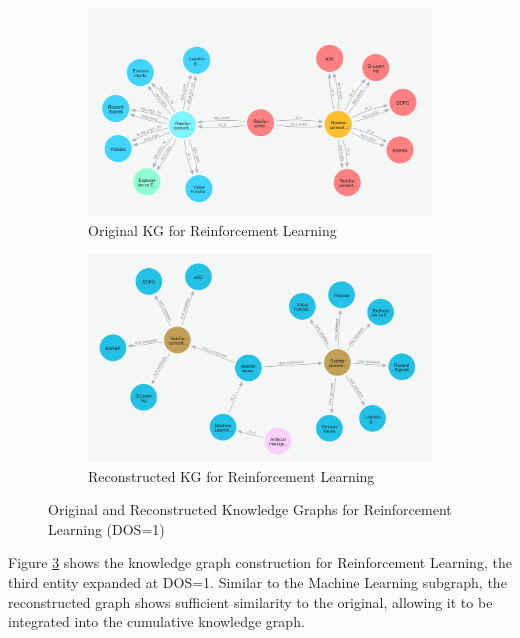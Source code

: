 \documentclass[11pt]{article}
\begin{document}
\begin{figure}[H]
    \centering
    \begin{subfigure}[b]{0.48\columnwidth}
        \centering
        \includegraphics[width=\textwidth]{img/original_dos1_Reinforcement_Learning.png}
        \caption{Original KG for Reinforcement Learning}
        \label{fig:dos1_rl_original}
    \end{subfigure}
    \hfill
    \begin{subfigure}[b]{0.48\columnwidth}
        \centering
        \includegraphics[width=\textwidth]{img/reconstructed_dos1_Reinforcement_Learning.png}
        \caption{Reconstructed KG for Reinforcement Learning}
        \label{fig:dos1_rl_reconstructed}
    \end{subfigure}
    \caption{Original and Reconstructed Knowledge Graphs for Reinforcement Learning (DOS=1)}
    \label{fig:comparison_dos1_rl}
\end{figure}

Figure \ref{fig:comparison_dos1_rl} shows the knowledge graph construction for Reinforcement Learning, the third entity expanded at DOS=1. Similar to the Machine Learning subgraph, the reconstructed graph shows sufficient similarity to the original, allowing it to be integrated into the cumulative knowledge graph.
\end{document}
